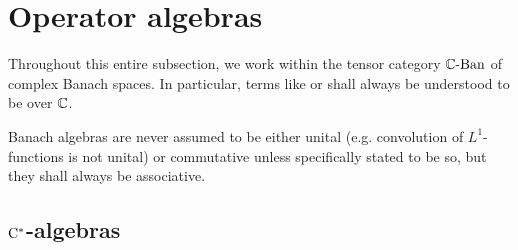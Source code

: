 \section{Operator algebras}
    \begin{convention}
        Throughout this entire subsection, we work within the tensor category $\mathbb{C}\text{-}\mathrm{Ban}$ of complex Banach spaces. In particular, terms like  or  shall always be understood to be over $\mathbb{C}$. 
    \end{convention}
    \begin{convention} \label{conv: banach_algebras_are_associative}
        Banach algebras are never assumed to be either unital (e.g. convolution of $L^1$-functions is not unital) or commutative unless specifically stated to be so, but they shall always be associative.
    \end{convention}
    
    \subsection{\texorpdfstring{$\mathrm{C}^*$}{}-algebras}
